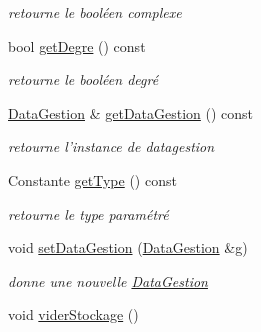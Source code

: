 \begin{DoxyCompactItemize}
\begin{DoxyCompactList}\small\item\em retourne le booléen complexe \item\end{DoxyCompactList}\item 
\hypertarget{classOnglet_a9ca61cf6944c13a33dcb4f791309d335}{
bool \hyperlink{classOnglet_a9ca61cf6944c13a33dcb4f791309d335}{getDegre} () const }
\label{classOnglet_a9ca61cf6944c13a33dcb4f791309d335}

\begin{DoxyCompactList}\small\item\em retourne le booléen degré \item\end{DoxyCompactList}\item 
\hypertarget{classOnglet_a2d77df58fdd09290ff544fcc70ae1e21}{
\hyperlink{classDataGestion}{DataGestion} \& \hyperlink{classOnglet_a2d77df58fdd09290ff544fcc70ae1e21}{getDataGestion} () const }
\label{classOnglet_a2d77df58fdd09290ff544fcc70ae1e21}

\begin{DoxyCompactList}\small\item\em retourne l'instance de datagestion \item\end{DoxyCompactList}\item 
\hypertarget{classOnglet_aa2ab00ac83fbf00f1cdbad816ff90fab}{
Constante \hyperlink{classOnglet_aa2ab00ac83fbf00f1cdbad816ff90fab}{getType} () const }
\label{classOnglet_aa2ab00ac83fbf00f1cdbad816ff90fab}

\begin{DoxyCompactList}\small\item\em retourne le type paramétré \item\end{DoxyCompactList}\item 
void \hyperlink{classOnglet_a37c3fd19396bff952d901a1e5b0f05e8}{setDataGestion} (\hyperlink{classDataGestion}{DataGestion} \&g)
\begin{DoxyCompactList}\small\item\em donne une nouvelle \hyperlink{classDataGestion}{DataGestion} \item\end{DoxyCompactList}\item 
\hypertarget{classOnglet_ac2d6c75d662b7c663e684711f59687ef}{
void \hyperlink{classOnglet_ac2d6c75d662b7c663e684711f59687ef}{viderStockage} ()}
\label{classOnglet_ac2d6c75d662b7c663e684711f59687ef}


\end{DoxyCompactItemize}
